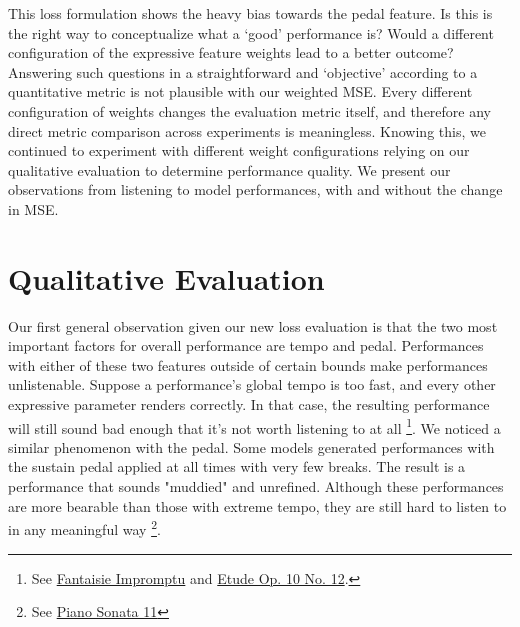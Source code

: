 This loss formulation shows the heavy bias towards the pedal feature. Is this is the right way to conceptualize what a `good' performance is? Would a different configuration of the expressive feature weights lead to a better outcome? Answering such questions in a straightforward and `objective' according to a quantitative metric is not plausible with our weighted MSE. Every different configuration of weights changes the evaluation metric itself, and therefore any direct metric comparison across experiments is meaningless. Knowing this, we continued to experiment with different weight configurations relying on our qualitative evaluation to determine performance quality. We present our observations from listening to model performances, with and without the change in MSE. 



\section{Qualitative Evaluation}\label{sec:qualitative-analysis}
Our first general observation given our new loss evaluation is that the two most important factors for overall performance are tempo and pedal. Performances with either of these two features outside of certain bounds make performances unlistenable. Suppose a performance's global tempo is too fast, and every other expressive parameter renders correctly. In that case, the resulting performance will still sound bad enough that it's not worth listening to at all \footnote{See \href{https://ui.neptune.ai/richt3211/thesis/e/THESIS-86/artifacts}{ Fantaisie Impromptu} and \href{https://ui.neptune.ai/richt3211/thesis/e/THESIS-126/artifacts}{ Etude Op. 10 No. 12}.}. We noticed a similar phenomenon with the pedal. Some models generated performances with the sustain pedal applied at all times with very few breaks. The result is a performance that sounds "muddied" and unrefined. Although these performances are more bearable than those with extreme tempo, they are still hard to listen to in any meaningful way \footnote{See \href{https://ui.neptune.ai/richt3211/thesis/e/THESIS-125/artifacts}{ Piano Sonata 11} }. 

